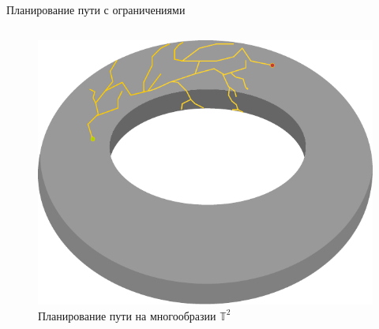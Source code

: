 \documentclass[11pt, aspectratio=169]{beamer}
\begin{document}
\begin{frame}{Планирование пути с ограничениями}
\begin{columns}[onlytextwidth]
\begin{column}{0.35\textwidth}
\begin{figure}
                \centering
                \includegraphics[width=\textwidth]{figures/graph/torus.pdf}
                \caption{Планирование пути на многообразии $\mathbb{T}^2$}
                \label{fig:my_label}
            \end{figure}
        \end{column}
    \end{columns}
\end{frame}
\end{document}

